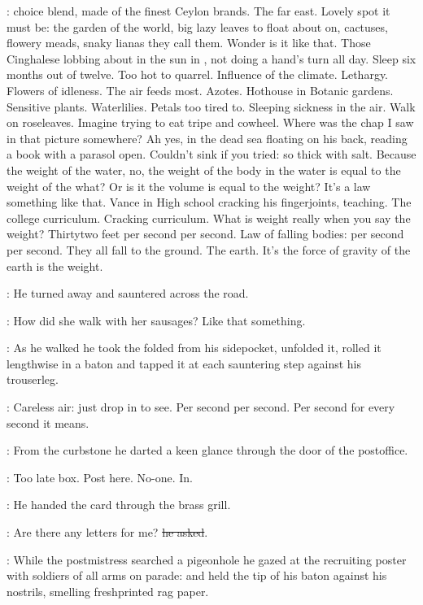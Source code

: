 \BloomInt:
choice blend, made of the finest Ceylon brands.
The far east.
Lovely spot it must be:
the garden of the world,
big lazy leaves to float about on,
cactuses, flowery meads,
snaky lianas they call them.
Wonder is it like that.
Those Cinghalese lobbing about in the sun in ,
not doing a hand's turn all day.
Sleep six months out of twelve.
Too hot to quarrel.
Influence of the climate.
Lethargy.
Flowers of idleness.
The air feeds most.
Azotes.
Hothouse in Botanic gardens.
Sensitive plants.
Waterlilies.
Petals too tired to.
Sleeping sickness in the air.
Walk on roseleaves.
Imagine trying to eat tripe and cowheel.
Where was the chap I saw in that picture somewhere?
Ah yes, in the dead sea floating on his back,
reading a book with a parasol open.
Couldn't sink if you tried:
so thick with salt.
Because the weight of the water,
no, the weight of the
body in the water
is equal to the weight of the what?
Or is it the volume
is equal to the weight?
It's a law something like that.
Vance in High school cracking his fingerjoints, teaching.
The college curriculum.
Cracking curriculum.
What is weight really when you say the weight?
Thirtytwo feet per second per second.
Law of falling bodies:
per second per second.
They all fall to the ground.
The earth.
It's the force of gravity of the earth
is the weight.


:
He turned away and sauntered across the road.

\BloomInt:
How did she walk with her sausages?
Like that something.

:
As he walked he took the folded  from his sidepocket,
unfolded it, rolled it lengthwise in a baton
and tapped it at each sauntering step against his trouserleg.

\BloomInt:
Careless air: just drop in to see.
Per second per second.
Per second for every second
it means.

:
From the curbstone
he darted a keen glance through the door of the postoffice.

\BloomInt:
Too late box.
Post here.
No-one.
In.

:
He handed the card through the brass grill.

\Bloom:
Are there any letters for me?
\sout{he asked}.


:
While the postmistress searched a pigeonhole
he gazed at the recruiting poster with soldiers of all arms on parade:
and held the tip of his baton against his nostrils,
smelling freshprinted rag paper.

